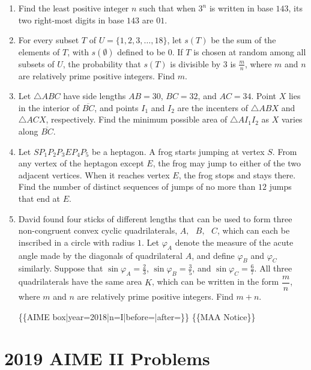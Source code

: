 \documentclass{article}
\begin{document}
\begin{enumerate}[label=\arabic*., itemsep=0.5em]
\par \vspace{0.5em}\item Find the least positive integer \(n\) such that when \(3^n\) is written in base \(143\), its two right-most digits in base \(143\) are \(01\).\par \vspace{0.5em}\item For every subset \(T\) of \(U = \{ 1,2,3,\ldots,18 \}\), let \(s(T)\) be the sum of the elements of \(T\), with \(s(\emptyset)\) defined to be \(0\). If \(T\) is chosen at random among all subsets of \(U\), the probability that \(s(T)\) is divisible by \(3\) is \(\frac{m}{n}\), where \(m\) and \(n\) are relatively prime positive integers. Find \(m\).\par \vspace{0.5em}\item Let \(\triangle ABC\) have side lengths \(AB=30\), \(BC=32\), and \(AC=34\). Point \(X\) lies in the interior of \(\overline{BC}\), and points \(I_1\) and \(I_2\) are the incenters of \(\triangle ABX\) and \(\triangle ACX\), respectively. Find the minimum possible area of \(\triangle AI_1I_2\) as \(X\) varies along \(\overline{BC}\).\par \vspace{0.5em}\item Let \(SP_1P_2P_3EP_4P_5\) be a heptagon. A frog starts jumping at vertex \(S\). From any vertex of the heptagon except \(E\), the frog may jump to either of the two adjacent vertices. When it reaches vertex \(E\), the frog stops and stays there. Find the number of distinct sequences of jumps of no more than \(12\) jumps that end at \(E\).\par \vspace{0.5em}\item David found four sticks of different lengths that can be used to form three non-congruent convex cyclic quadrilaterals, \(A,\text{ }B,\text{ }C\), which can each be inscribed in a circle with radius \(1\). Let \(\varphi_A\) denote the measure of the acute angle made by the diagonals of quadrilateral \(A\), and define \(\varphi_B\) and \(\varphi_C\) similarly. Suppose that \(\sin\varphi_A=\frac{2}{3}\), \(\sin\varphi_B=\frac{3}{5}\), and \(\sin\varphi_C=\frac{6}{7}\). All three quadrilaterals have the same area \(K\), which can be written in the form \(\dfrac{m}{n}\), where \(m\) and \(n\) are relatively prime positive integers. Find \(m+n\).



\{\{AIME box|year=2018|n=I|before=|after=\}\}
\{\{MAA Notice\}\}\par \vspace{0.5em}
\end{enumerate}
\newpage\section*{2019 AIME II Problems}
\end{document}
